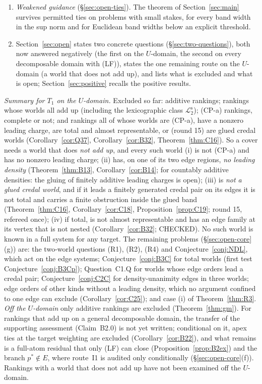 \documentclass[11pt]{article}
\theoremstyle{definition}
\theoremstyle{remark}
\newcommand{\Ltwo}{\mathcal L_2^{\mathrm s}}
\begin{document}
\begin{enumerate}[leftmargin=*]
\item \emph{Weakened guidance} (\S\ref{sec:open-ties}). The theorem of Section~\ref{sec:main} survives permitted ties on problems with small stakes, for every band width in the sup norm and for Euclidean band widths below an explicit threshold.
\item Section~\ref{sec:open} states two concrete questions (\S\ref{sec:two-questions}), both now answered negatively (the first on the $U$-domain, the second on every decomposable domain with (LF)), states the one remaining route on the $U$-domain (a world that does not add up), and lists what is excluded and what is open; Section~\ref{sec:positive} recalls the positive results.
\end{enumerate}
\emph{Summary for $T_1$ on the $U$-domain.} Excluded so far: additive rankings; rankings whose worlds all add up (including the lexicographic class $\Ltwo$); (CP-a) rankings, complete or not; and rankings all of whose worlds are (CP-a), have a nonzero leading charge, are total and almost representable, or (round 15) are glued credal worlds (Corollary~\ref{cor:Q37}, Corollary~\ref{cor:B32}, Theorem~\ref{thm:C16}). So a cover needs a world that does \emph{not add up}, and every such world (i) is not (CP-a) and has no nonzero leading charge; (ii) has, on one of its two edge regions, \emph{no leading density} (Theorem~\ref{thm:B13}, Corollary~\ref{cor:B14}; for countably additive densities: the gluing of finitely additive leading charges is open); (iii) is \emph{not a glued credal world}, and if it leads a finitely generated credal pair on its edges it is not total and carries a finite obstruction inside the glued band (Theorem~\ref{thm:C16}, Corollary~\ref{cor:C18}, Proposition~\ref{prop:C19}; round 15, refereed once); (iv) if total, is not almost representable and has an edge family at its vertex that is not nested (Corollary~\ref{cor:B32}; CHECKED). No such world is known in a full system for any target. The remaining problems (\S\ref{sec:open-core}(g)) are: the two-world questions (R1), (R2), (R4) and Conjecture~\ref{conj:NDL}, which act on the edge systems; Conjecture~\ref{conj:B3C} for total worlds (first test Conjecture~\ref{conj:B3Cp}); Question~C1.Q for worlds whose edge orders lead a credal pair; Conjecture~\ref{conj:C2C} for density-unanimity edges in three worlds; edge orders of other kinds without a leading density, which no argument confined to one edge can exclude (Corollary~\ref{cor:C25}); and case (i) of Theorem~\ref{thm:R3}. \emph{Off the $U$-domain} only additive rankings are excluded (Theorem~\ref{thm:gm}). For rankings that add up on a general decomposable domain, the transfer of the supporting assessment (Claim~B2.0) is not yet written; conditional on it, apex ties at the target weighting are excluded (Corollary~\ref{cor:B22}), and what remains is a full-atom residual that only (LF) can close (Proposition~\ref{prop:B2ex}) and the branch $p^*\notin E$, where route~I1 is audited only conditionally (\S\ref{sec:open-core}(f)). Rankings with a world that does not add up have not been examined off the $U$-domain.
\end{document}
